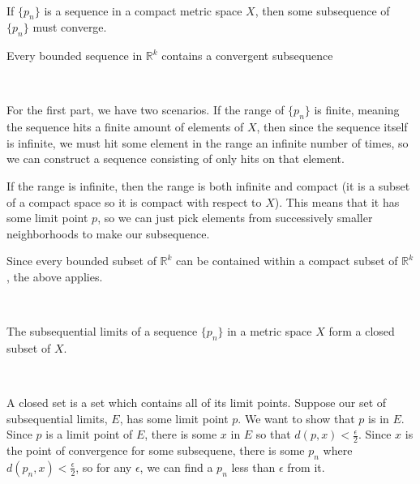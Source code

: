 \documentclass{article}
\begin{document}
\begin{theorem}
\

If $\{p_n\}$ is a sequence in a compact metric space $X$, then some subsequence of $\{p_n\}$ must converge.

Every bounded sequence in $\mathbb{R}^k$ contains a convergent subsequence
\end{theorem}

\begin{customproof}
\

For the first part, we have two scenarios. If the range of $\{p_n\}$ is finite, meaning the sequence hits a finite amount of elements of $X$, then since the sequence itself is infinite, we must hit some element in the range an infinite number of times, so we can construct a sequence consisting of only hits on that element.

If the range is infinite, then the range is both infinite and compact (it is a subset of a compact space so it is compact with respect to $X$). This means that it has some limit point $p$, so we can just pick elements from successively smaller neighborhoods to make our subsequence.

Since every bounded subset of $\mathbb{R}^k$ can be contained within a compact subset of $\mathbb{R}^k$, the above applies.
\end{customproof}

\begin{theorem}
\

The subsequential limits of a sequence $\{p_n\}$ in a metric space $X$ form a closed subset of $X$.
\end{theorem}

\begin{customproof}
\

A closed set is a set which contains all of its limit points. Suppose our set of subsequential limits, $E$, has some limit point $p$. We want to show that $p$ is in $E$. Since $p$ is a limit point of $E$, there is some $x$ in $E$ so that $d(p,x) < \frac{\epsilon}{2}$. Since $x$ is the point of convergence for some subsequene, there is some $p_n$ where $d(p_n, x) < \frac{\epsilon}{2}$, so for any $\epsilon$, we can find a $p_n$ less than $\epsilon$ from it.

\end{customproof}
\end{document}
